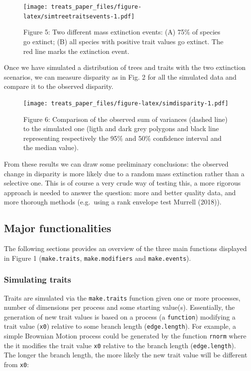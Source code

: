 \documentclass[
]{article}
\begin{document}
\begin{figure}
\centering
\texttt{[image: treats\_paper\_files/figure-latex/simtreetraitsevents-1.pdf]}
\caption{Figure 5: Two different mass extinction events: (A) 75\% of
species go extinct; (B) all species with positive trait values go
extinct. The red line marks the extinction event.}
\end{figure}

Once we have simulated a distribution of trees and traits with the two
extinction scenarios, we can measure disparity as in Fig. 2 for all the
simulated data and compare it to the observed disparity.

\begin{figure}
\centering
\texttt{[image: treats\_paper\_files/figure-latex/simdisparity-1.pdf]}
\caption{Figure 6: Comparison of the observed sum of variances (dashed
line) to the simulated one (ligth and dark grey polygons and black line
representing respectively the 95\% and 50\% confidence interval and the
median value).}
\end{figure}

From these results we can draw some preliminary conclusions: the
observed change in disparity is more likely due to a random mass
extinction rather than a selective one. This is of course a very crude
way of testing this, a more rigorous approach is needed to answer the
question: more and better quality data, and more thorough methods
(e.g.~using a rank envelope test Murrell (2018)).

\hypertarget{major-functionalities}{%
\subsection{Major functionalities}\label{major-functionalities}}

The following sections provides an overview of the three main functions
displayed in Figure 1 (\texttt{make.traits}, \texttt{make.modifiers} and
\texttt{make.events}).

\hypertarget{simulating-traits}{%
\subsubsection{Simulating traits}\label{simulating-traits}}

Traits are simulated via the \texttt{make.traits} function given one or
more processes, number of dimensions per process and some starting
value(s). Essentially, the generation of new trait values is based on a
process (a \texttt{function}) modifying a trait value (\texttt{x0})
relative to some branch length (\texttt{edge.length}). For example, a
simple Brownian Motion process could be generated by the function
\texttt{rnorm} where the it modifies the trait value \texttt{x0}
relative to the branch length (\texttt{edge.length}). The longer the
branch length, the more likely the new trait value will be different
from \texttt{x0}:
\end{document}
